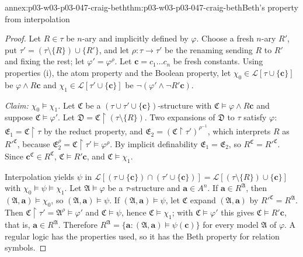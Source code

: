 \begin{annexitem}{annex:p03-w03-p03-047-craig-beth}{thm:p03-w03-p03-047-craig-beth}{Beth's property from interpolation}
\begin{proof}
Let \(R\in\tau\) be \(n\)-ary and implicitly defined by \(\varphi\).  Choose
a fresh \(n\)-ary \(R'\), put \(\tau'=(\tau\setminus\{R\})\cup\{R'\}\), and let
\(\rho:\tau\to\tau'\) be the renaming sending \(R\) to \(R'\) and fixing the
rest; let \(\varphi'=\varphi^\rho\).  Let \(\mathbf c=c_1\ldots c_n\) be
fresh constants.  Using properties (i), the atom property and the Boolean
property, let \(\chi_0\in\mathscr L[\tau\cup\{\mathbf c\}]\) be
\(\varphi\land R\mathbf c\) and \(\chi_1\in\mathscr L[\tau'\cup\{\mathbf c\}]\)
be \(\neg(\varphi'\land\neg R'\mathbf c)\).

\emph{Claim: \(\chi_0\models\chi_1\).}  Let \(\mathfrak C\) be a
\((\tau\cup\tau'\cup\{\mathbf c\})\)-structure with
\(\mathfrak C\models\varphi\land R\mathbf c\) and suppose
\(\mathfrak C\models\varphi'\).  Let \(\mathfrak D=\mathfrak C\restriction
(\tau\setminus\{R\})\).  Two expansions of \(\mathfrak D\) to \(\tau\)
satisfy \(\varphi\): \(\mathfrak E_1=\mathfrak C\restriction\tau\) by the
reduct property, and \(\mathfrak E_2=(\mathfrak C\restriction\tau')^{\rho^{-1}}\),
which interprets \(R\) as \(R'^{\mathfrak C}\), because
\(\mathfrak E_2^\rho=\mathfrak C\restriction\tau'\models\varphi^\rho\).  By
implicit definability \(\mathfrak E_1=\mathfrak E_2\), so
\(R^{\mathfrak C}=R'^{\mathfrak C}\).  Since
\(\mathbf c^{\mathfrak C}\in R^{\mathfrak C}\), \(\mathfrak C\models R'\mathbf c\),
and \(\mathfrak C\models\chi_1\).

Interpolation yields \(\psi\) in
\(\mathscr L[(\tau\cup\{\mathbf c\})\cap(\tau'\cup\{\mathbf c\})]=
\mathscr L[(\tau\setminus\{R\})\cup\{\mathbf c\}]\) with
\(\chi_0\models\psi\models\chi_1\).  Let \(\mathfrak A\models\varphi\) be a
\(\tau\)-structure and \(\mathbf a\in A^n\).  If
\(\mathbf a\in R^{\mathfrak A}\), then \((\mathfrak A,\mathbf a)\models\chi_0\),
so \((\mathfrak A,\mathbf a)\models\psi\).  If \((\mathfrak A,\mathbf a)\models\psi\),
let \(\mathfrak C\) expand \((\mathfrak A,\mathbf a)\) by
\(R'^{\mathfrak C}=R^{\mathfrak A}\).  Then
\(\mathfrak C\restriction\tau'=\mathfrak A^\rho\models\varphi'\) and
\(\mathfrak C\models\psi\), hence \(\mathfrak C\models\chi_1\); with
\(\mathfrak C\models\varphi'\) this gives \(\mathfrak C\models R'\mathbf c\),
that is, \(\mathbf a\in R^{\mathfrak A}\).  Therefore
\(R^{\mathfrak A}=\{\mathbf a:(\mathfrak A,\mathbf a)\models\psi(\mathbf c)\}\)
for every model \(\mathfrak A\) of \(\varphi\).  A regular logic has the
properties used, so it has the Beth property for relation symbols.
\end{proof}
\end{annexitem}

